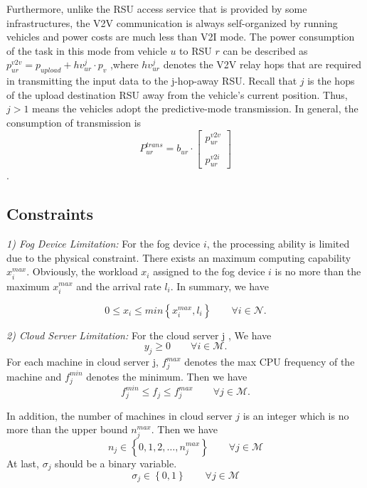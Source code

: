 \documentclass[twoside,twocolumn]{article}
\begin{document}
Furthermore, unlike the RSU access service that is provided by some infrastructures, the V2V communication is always self-organized by running vehicles and power costs are much less than V2I mode. The power consumption of the task in this mode from vehicle $u$ to RSU $r$ can be described as $p_{ur}^{v2v} = p_{upload}+hv_{ur}^j \cdot p_{v}$  ,where $hv_{ur}^j$ denotes the V2V relay hops that are required in transmitting the input data to the j-hop-away RSU. Recall that $j$ is the hops of the upload destination RSU away from the vehicle's current position. Thus,$j>1$ means the vehicles adopt the predictive-mode transmission.%
In general, the consumption of transmission is  
$$ P_{ur}^{trans} = b_{ur} \cdot \begin{bmatrix}
p_{ur}^{v2v} \\
\\
p_{ur}^{v2i}
\end{bmatrix} $$.

\subsection{Constraints}

\textit{1) Fog Device Limitation:} For the fog device $i$, the processing ability is limited due to the physical constraint. There exists an maximum computing capability $x_i^{max}$. Obviously, the workload $x_i$ assigned to the fog device $i$ is no more than the maximum $x_i^{max}$ and the arrival rate $l_i$. In summary, we have

\begin{equation}
0 \leq x_i \leq min\left\{x_i^{max} , l_i\right\} \qquad \forall  i\in \mathcal{N}.
\end{equation}


\textit{2) Cloud Server Limitation:} For the cloud server j , We have 
\begin{equation}
y_j \geq 0 \qquad \forall i \in \mathcal{M}.
\end{equation}
For each machine in cloud server j, $f_j^{max}$ denotes the max CPU frequency of the machine and $f_j^{min}$ denotes the minimum. Then we have 
\begin{equation}
f_j^{min} \leq f_j \leq f_j^{max} \qquad \forall j \in \mathcal{M}.
\end{equation}

In addition, the number of machines in cloud server $j$ is an integer which is no more than the upper bound $n_j^{max}$. Then we have
\begin{equation}
n_j \in \left\{ 0,1,2,\dots,n_j^{max} \right\} \qquad \forall j \in \mathcal{M}
\end{equation}
At last, $\sigma_j$ should be a binary variable.
\begin{equation}
\sigma_j \in \left\{0,1\right\} \qquad \forall j \in \mathcal{M}
\end{equation}
\end{document}
